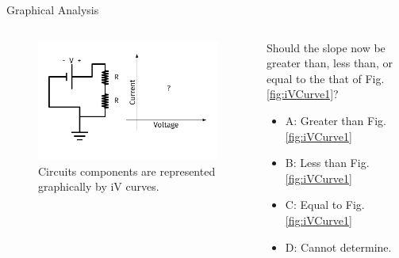 \documentclass{beamer}
\begin{document}
\begin{frame}{Graphical Analysis}
\begin{columns}[T]
\begin{column}{0.5\textwidth}
\begin{figure}
\centering
\includegraphics[width=\textwidth,trim=0.5cm 0cm 1cm 0cm,clip=true]{figures/iVCurve2.pdf}
\caption{\label{fig:iVCurve2} Circuits components are represented graphically by iV curves.}
\end{figure}
\end{column}
\begin{column}{0.5\textwidth}
\small
Should the slope now be greater than, less than, or equal to the that of Fig. \ref{fig:iVCurve1}?
\begin{itemize}
\item A: Greater than Fig. \ref{fig:iVCurve1}
\item B: Less than Fig. \ref{fig:iVCurve1}
\item C: Equal to Fig. \ref{fig:iVCurve1}
\item D: Cannot determine.
\end{itemize}
\end{column}
\end{columns}
\end{frame}
\end{document}
